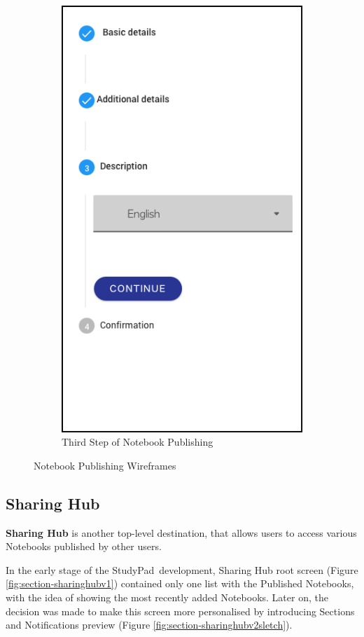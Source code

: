 \documentclass[thesis=B,english]{FITthesis}[2012/10/20]
\newcommand{\appname}{StudyPad}
\begin{document}
\begin{figure}
\begin{subfigure}{.5\textwidth}
  \includegraphics[scale=0.4]{step3}
  \caption{Third Step of Notebook Publishing }
  \label{fig:step3}
\end{subfigure}

\caption{Notebook Publishing Wireframes}
\label{fig:publishing-wireframe}
\end{figure}




\subsection{Sharing Hub}

\textbf{Sharing Hub} is another top-level destination, that allows users to access various Notebooks published by other users.

In the early stage of the \appname\ development, Sharing Hub root screen (Figure \ref{fig:section-sharinghubv1}) contained only one list with the Published Notebooks, with the idea of showing the most recently added Notebooks. Later on, the decision was made to make this screen more personalised by introducing Sections and Notifications preview (Figure \ref{fig:section-sharinghubv2sletch}).
\end{document}
